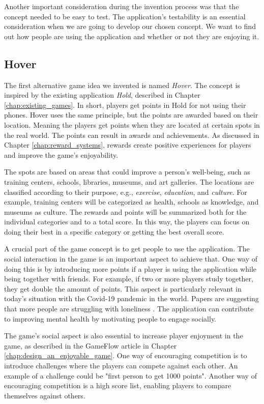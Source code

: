 Another important consideration during the invention process was that the concept needed to be easy to test. The application’s testability is an essential consideration when we are going to develop our chosen concept. We want to find out how people are using the application and whether or not they are enjoying it.

\subsection{Hover}
\label{sec:hover}
The first alternative game idea we invented is named \textit{Hover}. The concept is inspired by the existing application \textit{Hold}, described in Chapter \ref{chap:existing_games}. In short, players get points in Hold for not using their phones. Hover uses the same principle, but the points are awarded based on their location. Meaning the players get points when they are located at certain spots in the real world. The points can result in awards and achievements. As discussed in Chapter \ref{chap:reward_systems}, rewards create positive experiences for players and improve the game’s enjoyability.

The spots are based on areas that could improve a person’s well-being, such as training centers, schools, libraries, museums, and art galleries. The locations are classified according to their purpose, e.g., \textit{exercise}, \textit{education}, and \textit{culture}. For example, training centers will be categorized as health, schools as knowledge, and museums as culture. The rewards and points will be summarized both for the individual categories and to a total score. In this way, the players can focus on doing their best in a specific category or getting the best overall score.

A crucial part of the game concept is to get people to use the application. The social interaction in the game is an important aspect to achieve that. One way of doing this is by introducing more points if a player is using the application while being together with friends. For example, if two or more players study together, they get double the amount of points. This aspect is particularly relevant in today’s situation with the Covid-19 pandemic in the world. Papers are suggesting that more people are struggling with loneliness \citep{groarke_loneliness_2020}. The application can contribute to improving mental health by motivating people to engage socially.

The game’s social aspect is also essential to increase player enjoyment in the game, as described in the GameFlow article in Chapter \ref{chap:design_an_enjoyable_game}. One way of encouraging competition is to introduce challenges where the players can compete against each other. An example of a challenge could be "first person to get 1000 points". Another way of encouraging competition is a high score list, enabling players to compare themselves against others.

